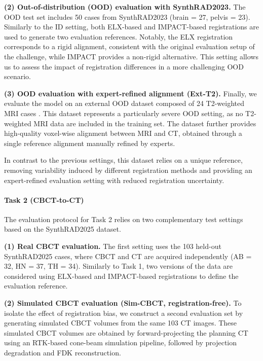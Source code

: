 \documentclass[lettersize,journal]{IEEEtran}
\begin{document}
\textbf{(2) Out-of-distribution (OOD) evaluation with SynthRAD2023.} 
The OOD test set includes 50 cases from SynthRAD2023 (brain = 27, pelvis = 23). 
Similarly to the ID setting, both ELX-based and IMPACT-based registrations are used to generate two evaluation references. Notably, the ELX registration corresponds to a rigid alignment, consistent with the original evaluation setup of the challenge, while IMPACT provides a non-rigid alternative. This setting allows us to assess the impact of registration differences in a more challenging OOD scenario.

\textbf{(3) OOD evaluation with expert-refined alignment (Ext-T2).} 
Finally, we evaluate the model on an external OOD dataset composed of 24 T2-weighted MRI cases \cite{dowling2015automatic}. 
This dataset represents a particularly severe OOD setting, as no T2-weighted MRI data are included in the training set. 
The dataset further provides high-quality voxel-wise alignment between MRI and CT, obtained through a single reference alignment manually refined by experts. 

In contrast to the previous settings, this dataset relies on a unique reference, removing variability induced by different registration methods and providing an expert-refined evaluation setting with reduced registration uncertainty.

\paragraph{Task 2 (CBCT-to-CT)}

The evaluation protocol for Task 2 relies on two complementary test settings based on the SynthRAD2025 dataset.

\textbf{(1) Real CBCT evaluation.} 
The first setting uses the 103 held-out SynthRAD2025 cases, where CBCT and CT are acquired independently (AB = 32, HN = 37, TH = 34). 
Similarly to Task 1, two versions of the data are considered using ELX-based and IMPACT-based registrations to define the evaluation reference. 

\textbf{(2) Simulated CBCT evaluation (Sim-CBCT, registration-free).} 
To isolate the effect of registration bias, we construct a second evaluation set by generating simulated CBCT volumes from the same 103 CT images. 
These simulated CBCT volumes are obtained by forward-projecting the planning CT using an RTK-based \cite{rit2014reconstruction} cone-beam simulation pipeline, followed by projection degradation and FDK reconstruction.
\end{document}
